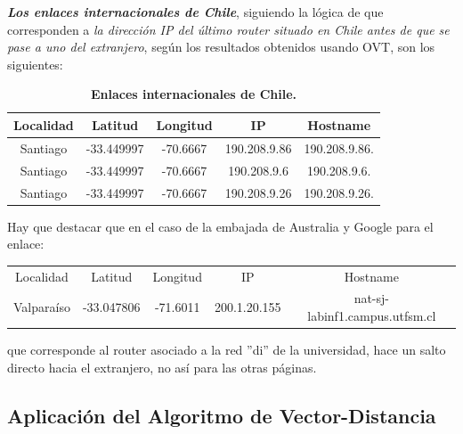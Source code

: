 \documentclass[12pt]{article}
\begin{document}
\textbf{\textit{Los enlaces internacionales de Chile}}, siguiendo la lógica de que corresponden a \emph{la dirección IP del último router situado en Chile antes de que se pase a uno del extranjero}, según los resultados obtenidos usando OVT, son los siguientes:

\begin{table}[H]
\centering
\begin{tabular}{| c | c | c | c | c |}
\hline
Localidad & Latitud & Longitud & IP & Hostname\\
\hline
Santiago & -33.449997 & -70.6667 & 190.208.9.86 & 190.208.9.86.\\
\hline
Santiago & -33.449997 & -70.6667 & 190.208.9.6 & 190.208.9.6.\\
\hline
Santiago & -33.449997 & -70.6667 & 190.208.9.26 & 190.208.9.26.\\
\hline
\end{tabular}
\caption{\small \textbf{Enlaces internacionales de Chile.}}
\end{table}

Hay que destacar que en el caso de la embajada de Australia y Google para el enlace:

\begin{table}[H]
\centering
\begin{tabular}{ c  c  c  c  c }
Localidad & Latitud & Longitud & IP & Hostname\\
Valparaíso & -33.047806 & -71.6011 & 200.1.20.155 & nat-sj-labinf1.campus.utfsm.cl\\
\end{tabular}
\end{table}

que corresponde al router asociado a la red ''di'' de la universidad, hace un salto directo hacia el extranjero, no así para las otras páginas.

\newpage

\subsection{Aplicación del Algoritmo de Vector-Distancia}
\end{document}
